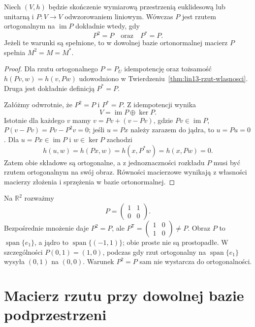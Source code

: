 \begin{twierdzenie}
\label{thm:lin13-projection-characterization}
Niech \((V,h)\) będzie skończenie
wymiarową przestrzenią euklidesową
lub unitarną i \(P\colon V\to V\)
odwzorowaniem liniowym.
Wówczas \(P\) jest rzutem
ortogonalnym na \(\operatorname{im}P\)
dokładnie wtedy, gdy
\[
 P^2=P\quad\text{oraz}\quad P^*=P.
\]
Jeżeli te warunki są spełnione,
to w dowolnej bazie ortonormalnej
macierz \(P\) spełnia
\(M^2=M=M^*\).
\end{twierdzenie}
\begin{proof}
Dla rzutu ortogonalnego
\(P=P_U\) idempotencję
oraz tożsamość
\(h(Pv,w)=h(v,Pw)\)
udowodniono w
Twierdzeniu~\ref{thm:lin13-rzut-wlasnosci}.
Druga jest dokładnie
definicją \(P^*=P\).

Załóżmy odwrotnie,
że \(P^2=P\) i \(P^*=P\).
Z idempotencji wynika
\[
 V=\operatorname{im}P\oplus\ker P.
\]
Istotnie dla każdego \(v\)
mamy \(v=Pv+(v-Pv)\), gdzie
\(Pv\in\operatorname{im}P\),
\(P(v-Pv)=Pv-P^2v=0\);
jeśli \(u=Px\) należy
zarazem do jądra, to
\(u=Pu=0\).
Dla \(u=Px\in\operatorname{im}P\)
i \(w\in\ker P\) zachodzi
\[
 h(u,w)=h(Px,w)=h(x,P^*w)
       =h(x,Pw)=0.
\]
Zatem obie składowe
są ortogonalne, a z
jednoznaczności rozkładu
\(P\) musi być rzutem
ortogonalnym na swój obraz.
Równości macierzowe wynikają
z własności macierzy złożenia
i sprzężenia w bazie
ortonormalnej.
\end{proof}

\begin{przyklad}
\label{prz:lin13-oblique}
Na \(\mathbb R^2\) rozważmy
\[
 P=\begin{pmatrix}1&1\\0&0\end{pmatrix}.
\]
Bezpośrednie mnożenie daje
\(P^2=P\), ale
\(P^{\mathsf T}
=\begin{pmatrix}1&0\\1&0\end{pmatrix}
\ne P\).
Obraz \(P\) to
\(\operatorname{span}\{e_1\}\),
a jądro to
\(\operatorname{span}\{(-1,1)\}\);
obie proste nie są prostopadłe.
W szczególności
\(P(0,1)=(1,0)\),
podczas gdy rzut ortogonalny
na \(\operatorname{span}\{e_1\}\)
wysyła \((0,1)\) na \((0,0)\).
Warunek \(P^2=P\) sam nie
wystarcza do ortogonalności.
\end{przyklad}

\section{Macierz rzutu przy dowolnej bazie podprzestrzeni}
\label{sec:lin13-matrix-projection}

